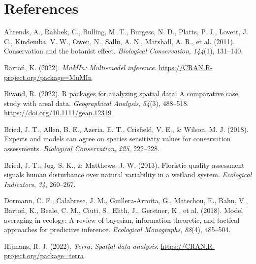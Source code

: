 \documentclass[
]{article}
\newlength{\cslhangindent}
\newlength{\cslentryspacingunit} %
\newenvironment{CSLReferences}[2] %
 {%
  \setlength{\parindent}{0pt}
  \ifodd #1
  \let\oldpar\par
  \def\par{\hangindent=\cslhangindent\oldpar}
  \fi
  \setlength{\parskip}{#2\cslentryspacingunit}
 }%
 {}
\begin{document}
\newpage

\hypertarget{references}{%
\section*{References}\label{references}}

\hypertarget{refs}{}
\begin{CSLReferences}{1}{0}
\leavevmode{}%
Ahrends, A., Rahbek, C., Bulling, M. T., Burgess, N. D., Platts, P. J.,
Lovett, J. C., Kindemba, V. W., Owen, N., Sallu, A. N., Marshall, A. R.,
et al. (2011). Conservation and the botanist effect. \emph{Biological
Conservation}, \emph{144}(1), 131--140.

\leavevmode{}%
Bartoń, K. (2022). \emph{MuMIn: Multi-model inference}.
\url{https://CRAN.R-project.org/package=MuMIn}

\leavevmode{}%
Bivand, R. (2022). R packages for analyzing spatial data: A comparative
case study with areal data. \emph{Geographical Analysis}, \emph{54}(3),
488--518. \url{https://doi.org/10.1111/gean.12319}

\leavevmode{}%
Bried, J. T., Allen, B. E., Azeria, E. T., Crisfield, V. E., \& Wilson,
M. J. (2018). Experts and models can agree on species sensitivity values
for conservation assessments. \emph{Biological Conservation},
\emph{225}, 222--228.

\leavevmode{}%
Bried, J. T., Jog, S. K., \& Matthews, J. W. (2013). Floristic quality
assessment signals human disturbance over natural variability in a
wetland system. \emph{Ecological Indicators}, \emph{34}, 260--267.

\leavevmode{}%
Dormann, C. F., Calabrese, J. M., Guillera-Arroita, G., Matechou, E.,
Bahn, V., Bartoń, K., Beale, C. M., Ciuti, S., Elith, J., Gerstner, K.,
et al. (2018). Model averaging in ecology: A review of bayesian,
information-theoretic, and tactical approaches for predictive inference.
\emph{Ecological Monographs}, \emph{88}(4), 485--504.

\leavevmode{}%
Hijmans, R. J. (2022). \emph{Terra: Spatial data analysis}.
\url{https://CRAN.R-project.org/package=terra}


\end{CSLReferences}
\end{document}
